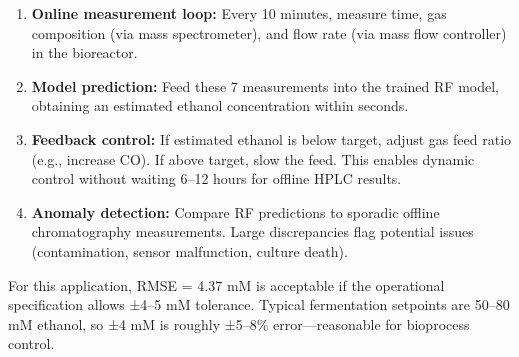 \documentclass[conference]{IEEEtran}
\begin{document}
\begin{enumerate}
\item \textbf{Online measurement loop:} Every 10 minutes, measure time, gas composition (via mass spectrometer), and flow rate (via mass flow controller) in the bioreactor.
\item \textbf{Model prediction:} Feed these 7 measurements into the trained RF model, obtaining an estimated ethanol concentration within seconds.
\item \textbf{Feedback control:} If estimated ethanol is below target, adjust gas feed ratio (e.g., increase CO). If above target, slow the feed. This enables dynamic control without waiting 6–12 hours for offline HPLC results.
\item \textbf{Anomaly detection:} Compare RF predictions to sporadic offline chromatography measurements. Large discrepancies flag potential issues (contamination, sensor malfunction, culture death).
\end{enumerate}

For this application, RMSE = 4.37 mM is acceptable if the operational specification allows ±4–5 mM tolerance. Typical fermentation setpoints are 50–80 mM ethanol, so ±4 mM is roughly ±5–8\% error—reasonable for bioprocess control.
\end{document}
